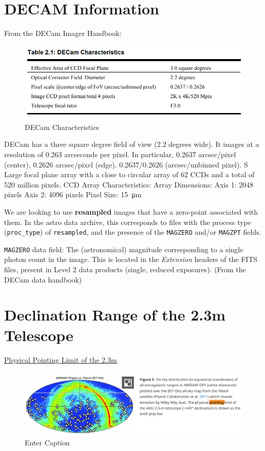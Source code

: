 \documentclass{article}
\begin{document}
\section{DECAM Information}
From the DECam Imager Handbook: \newline
\begin{figure}[hbt!]
    \centering
    \includegraphics[width=0.5\linewidth]{Decam Characteristics.png}
    \caption{DECam Characteristics}
    \label{fig:enter-label}
\end{figure}
DECam has a three square degree field of view (2.2 degrees wide). It images at a resolution of 0.263 arcseconds per pixel. In particular, 0.2637 arcsec/pixel (center), 0.2626 arcsec/pixel (edge).  0.2637/0.2626 (arcsec/unbinned pixel). S Large focal plane array with a close to circular array of 62 CCDs and a total of 520 million pixels. 
\newline 
CCD Array Characteristics:
\newline
Array Dimensions: 
    Axis 1: 2048 pixels
    Axis 2: 4096 pixels
\newline
Pixel Size: \SI{15}{\micro\metre}

We are looking to use \textbf{resampled} images that have a zero-point associated with them. In the astro data archive, this corresponds to files with the process type (\texttt{proc_type}) of \texttt{resampled}, and the presence of the \texttt{MAGZERO} and/or \texttt{MAGZPT} fields.

\texttt{MAGZERO} data field: The (astronomical) magnitude corresponding to a single photon count in the image. This is located in the \textit{Extension} headers of the FITS files, present in Level 2 data products (single, reduced exposures). (From the DECam data handbook)\\

\section{Declination Range of the 2.3m Telescope}
\href{https://www.cambridge.org/core/journals/publications-of-the-astronomical-society-of-australia/article/anu-wifes-supernova-programme-awsnap/1DF292200162D34D6E5A268CE18C3653} {Physical Pointing Limit of the 2.3m}
\begin{figure}[hbt!]
    \centering
    \includegraphics[width=0.5\linewidth]{image.png}
    \caption{Enter Caption}
    \label{fig:enter-label}
\end{figure}
\end{document}
